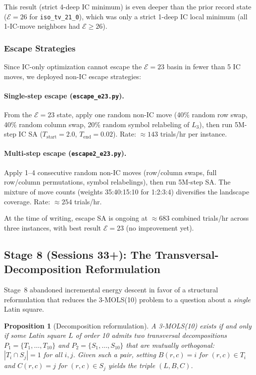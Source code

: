\documentclass[11pt,a4paper]{article}
\newtheorem{proposition}[theorem]{Proposition}
\theoremstyle{remark}
\newcommand{\E}{\mathcal{E}}
\begin{document}
This result (strict 4-deep IC minimum) is even deeper than the prior record state
($\E=26$ for \texttt{iso\_tv\_21\_0}), which was only a strict 1-deep IC local minimum
(all 1-IC-move neighbors had $\E \geq 26$).

\subsubsection{Escape Strategies}

Since IC-only optimization cannot escape the $\E=23$ basin in fewer than 5 IC moves,
we deployed non-IC escape strategies:

\paragraph{Single-step escape (\texttt{escape\_e23.py}).}
From the $\E=23$ state, apply one random non-IC move (40\% random row swap, 40\%
random column swap, 20\% random symbol relabeling of $L_3$), then run 5M-step IC SA
($T_\text{start}=2.0$, $T_\text{end}=0.02$). Rate: $\approx 143$ trials/hr per instance.

\paragraph{Multi-step escape (\texttt{escape2\_e23.py}).}
Apply 1--4 consecutive random non-IC moves (row/column swaps, full row/column
permutations, symbol relabelings), then run 5M-step SA. The mixture of move counts
(weights 35:40:15:10 for 1:2:3:4) diversifies the landscape coverage.
Rate: $\approx 254$ trials/hr.

At the time of writing, escape SA is ongoing at $\approx 683$ combined trials/hr
across three instances, with best result $\E=23$ (no improvement yet).

\subsection{Stage 8 (Sessions 33+): The Transversal-Decomposition Reformulation}
\label{sec:stage8}

Stage~8 abandoned incremental energy descent in favor of a structural
reformulation that reduces the 3-MOLS(10) problem to a question about a
\emph{single} Latin square.

\begin{proposition}[Decomposition reformulation]\label{prop:ddecomp}
A 3-MOLS(10) exists if and only if some Latin square $L$ of order 10 admits two
transversal decompositions $P_1 = \{T_1,\dots,T_{10}\}$ and
$P_2 = \{S_1,\dots,S_{10}\}$ that are mutually orthogonal:
$|T_i \cap S_j| = 1$ for all $i,j$. Given such a pair, setting $B(r,c)=i$ for
$(r,c) \in T_i$ and $C(r,c)=j$ for $(r,c) \in S_j$ yields the triple $(L,B,C)$.
\end{proposition}
\end{document}
